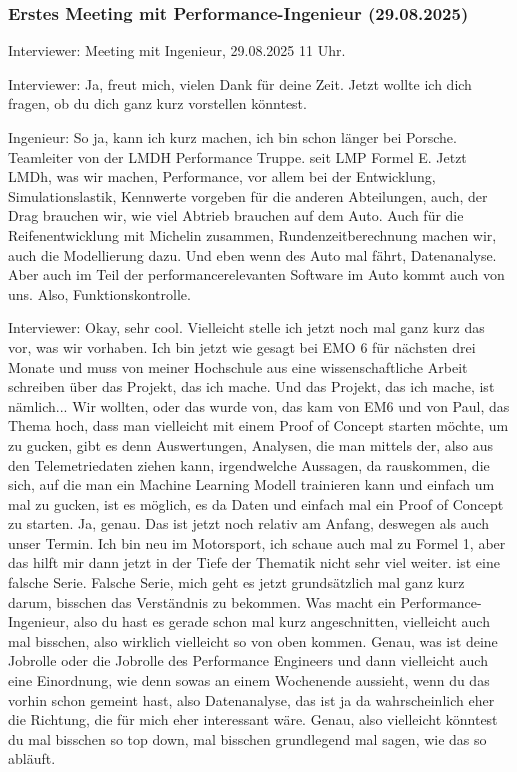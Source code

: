 
\subsubsection{Erstes Meeting mit Performance-Ingenieur (29.08.2025)}
\label{subsec:transkript-meeting1}


Interviewer: 
Meeting mit Ingenieur, 29.08.2025 11 Uhr. 


Interviewer: 
Ja, freut mich, vielen Dank für deine Zeit.  
Jetzt wollte ich dich fragen, ob du dich ganz kurz vorstellen könntest.  

Ingenieur: 
So ja, kann ich kurz machen, ich bin schon länger bei Porsche.   Teamleiter  von der LMDH Performance Truppe.   seit LMP Formel E. Jetzt LMDh, was wir machen, Performance, vor  allem bei der Entwicklung, Simulationslastik, Kennwerte vorgeben für die anderen Abteilungen, auch, der Drag brauchen wir, wie viel Abtrieb brauchen auf dem Auto.    Auch für die Reifenentwicklung mit Michelin zusammen, Rundenzeitberechnung machen wir, auch die Modellierung dazu. Und eben wenn des Auto mal fährt, Datenanalyse. Aber auch im Teil der performancerelevanten Software im Auto kommt auch von uns. Also, Funktionskontrolle. 

Interviewer: 
Okay, sehr cool. Vielleicht stelle ich jetzt noch mal ganz kurz das vor, was wir vorhaben. Ich bin jetzt wie gesagt bei EMO 6 für nächsten drei Monate und muss von meiner Hochschule aus eine wissenschaftliche Arbeit schreiben über das Projekt, das ich mache. Und das Projekt, das ich mache, ist nämlich...  Wir wollten, oder das wurde von, das kam von EM6 und von Paul, das Thema hoch, dass man vielleicht mit einem Proof of Concept starten möchte, um zu gucken, gibt es denn Auswertungen, Analysen, die man mittels der, also aus den Telemetriedaten ziehen kann, irgendwelche Aussagen, da rauskommen, die sich, auf die man ein Machine Learning Modell trainieren kann und einfach um mal zu gucken, ist es möglich, es da  Daten und einfach mal ein Proof of Concept zu starten.  Ja, genau. Das ist jetzt noch relativ am Anfang, deswegen als auch unser Termin. Ich bin neu im Motorsport, ich  schaue auch mal zu Formel 1, aber das hilft mir dann jetzt in der Tiefe der Thematik nicht sehr viel weiter. ist eine falsche Serie. Falsche Serie, mich geht es jetzt grundsätzlich mal ganz kurz darum, bisschen das Verständnis zu bekommen. Was  macht ein Performance-Ingenieur, also du hast es gerade schon mal kurz angeschnitten, vielleicht auch mal bisschen, also wirklich vielleicht so von oben kommen.  Genau,  was ist deine Jobrolle oder die Jobrolle des Performance Engineers und dann vielleicht auch eine Einordnung, wie denn sowas an einem Wochenende aussieht, wenn du das vorhin schon gemeint hast, also Datenanalyse, das ist ja da wahrscheinlich eher die Richtung, die für mich eher interessant wäre. Genau, also vielleicht könntest du mal bisschen so top down, mal bisschen grundlegend mal sagen, wie das so abläuft.  


